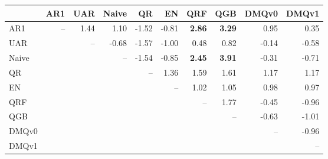 \begin{tabular}{lrrrrrrrrr}
\toprule
 & AR1 & UAR & Naive & QR & EN & QRF & QGB & DMQv0 & DMQv1 \\
\midrule
AR1 & -- & 1.44 & 1.10 & -1.52 & -0.81 & \textbf{2.86} & \textbf{3.29} & 0.95 & 0.35 \\
UAR &  & -- & -0.68 & -1.57 & -1.00 & 0.48 & 0.82 & -0.14 & -0.58 \\
Naive &  &  & -- & -1.54 & -0.85 & \textbf{2.45} & \textbf{3.91} & -0.31 & -0.71 \\
QR &  &  &  & -- & 1.36 & 1.59 & 1.61 & 1.17 & 1.17 \\
EN &  &  &  &  & -- & 1.02 & 1.05 & 0.98 & 0.97 \\
QRF &  &  &  &  &  & -- & 1.77 & -0.45 & -0.96 \\
QGB &  &  &  &  &  &  & -- & -0.63 & -1.01 \\
DMQv0 &  &  &  &  &  &  &  & -- & -0.96 \\
DMQv1 &  &  &  &  &  &  &  &  & -- \\
\bottomrule
\end{tabular}
